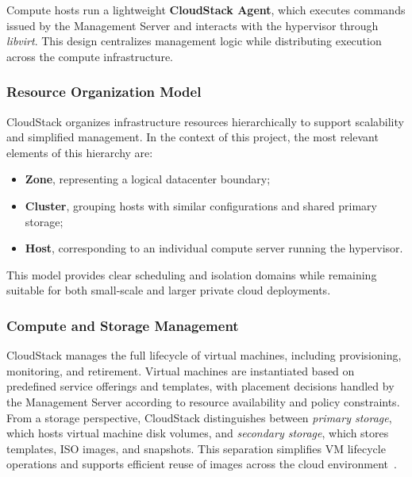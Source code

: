 \documentclass[sigplan]{acmart}
\begin{document}
    		Compute hosts run a lightweight \textbf{CloudStack Agent}, which executes commands issued by the Management Server and interacts with the hypervisor through \textit{libvirt}. This design centralizes management logic while distributing execution across the compute infrastructure.
    
    	\subsubsection{Resource Organization Model}
    		CloudStack organizes infrastructure resources hierarchically to support scalability and simplified management. In the context of this project, the most relevant elements of this hierarchy are:
    
            \begin{itemize}
                \item \textbf{Zone}, representing a logical datacenter boundary;
                \item \textbf{Cluster}, grouping hosts with similar configurations and shared primary storage;
                \item \textbf{Host}, corresponding to an individual compute server running the hypervisor.
            \end{itemize}
    
    		This model provides clear scheduling and isolation domains while remaining suitable for both small-scale and larger private cloud deployments\cite{vogelPrivateIaaSClouds2016}.
    
    	\subsubsection{Compute and Storage Management}
    		CloudStack manages the full lifecycle of virtual machines, including provisioning, monitoring, and retirement. Virtual machines are instantiated based on predefined service offerings and templates, with placement decisions handled by the Management Server according to resource availability and policy constraints.\\
    
    		From a storage perspective, CloudStack distinguishes between \textit{primary storage}, which hosts virtual machine disk volumes, and \textit{secondary storage}, which stores templates, ISO images, and snapshots. This separation simplifies VM lifecycle operations and supports efficient reuse of images across the cloud environment~\cite{IntroductionApacheCloudStack}.\\
    
\end{document}
